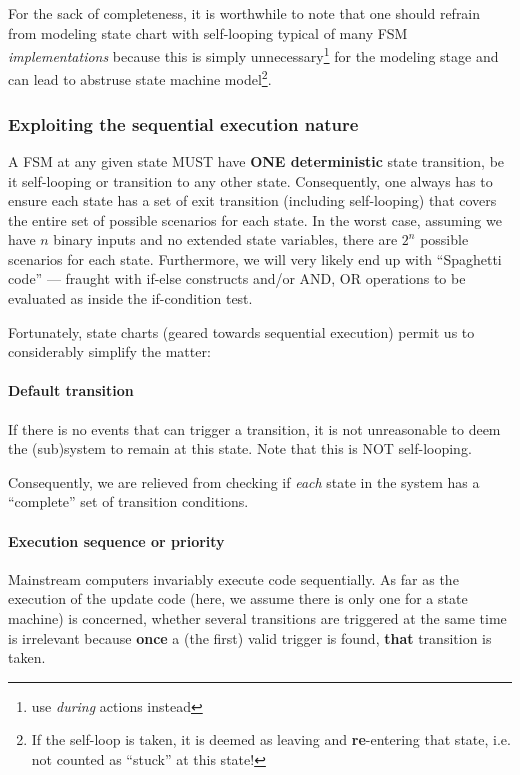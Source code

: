 \documentclass[12pt,a4paper]{scrartcl}
\begin{document}
		For the sack of completeness, it is worthwhile to note that one should refrain from modeling state chart with self-looping typical of many FSM \textit{implementations} because this is simply unnecessary\footnote{use \textit{during} actions instead} for the modeling stage and can lead to abstruse state machine model\footnote{If the self-loop is taken, it is deemed as leaving and \textbf{re}-entering that state, i.e. not counted as ``stuck'' at this state!}.
	\subsubsection{Exploiting the sequential execution nature}
	 \label{sec:state:transition:precedence}
	 A FSM at any given state MUST have \textbf{ONE deterministic} state transition, be it self-looping or transition to any other state.
	 Consequently, one always has to ensure each state has a set of exit transition (including self-looping) that covers the entire set of possible scenarios for each state. In the worst case, assuming we have $n$ binary inputs and no extended state variables, there are $2^n$ possible scenarios for each state. 
	 Furthermore, we will very likely end up with ``Spaghetti code'' --- fraught with if-else constructs and/or AND, OR operations to be evaluated as inside the if-condition test.
	 
	 Fortunately, state charts (geared towards sequential execution) permit us to considerably simplify the matter:
	
	\paragraph{Default transition} If there is no events that can trigger a transition, it is not unreasonable to deem the (sub)system to remain at this state. Note that this is NOT self-looping.
	
	Consequently, we are relieved from checking if \textit{each} state in the system has a ``complete'' set of transition conditions.
	\paragraph{Execution sequence or priority} Mainstream computers invariably execute code sequentially. As far as the execution of the update code (here, we assume there is only one for a state machine) is concerned, whether several transitions are triggered at the same time is irrelevant because \textbf{once} a (the first) valid trigger is found, \textbf{that} transition is taken.
	
\end{document}
